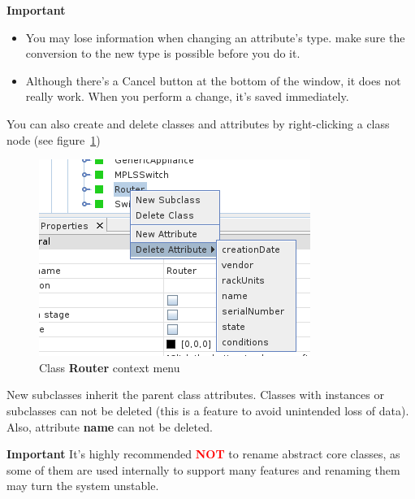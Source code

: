 \documentclass[a4paper]{article}
\begin{document}
			\begin{framed} {\large \textbf{Important}}
				\begin{itemize}
					\item You may lose information when changing an attribute's type. make sure the conversion to the new type is possible before you do it.
					\item Although there's a Cancel button at the bottom of the window, it does not	really work. When you perform a change, it's saved immediately.
				\end{itemize}
			\end{framed}
			You can also create and delete classes and attributes by right-clicking a class node (see figure~\ref{fig:class_node_menu})
			\begin{figure}[h!]
				\centering
				\includegraphics[width=0.4\linewidth]{img/class_node_menu.png}
				\caption{Class \textbf{Router} context menu}
				\label{fig:class_node_menu}
			\end{figure}
			New subclasses inherit the parent class attributes. Classes with instances or subclasses can not be deleted (this is  a  feature to avoid unintended loss of  data). Also, attribute \textbf{name} can not be deleted.
			\begin{framed} {\large \textbf{Important}}
				It's highly recommended \textbf{\textcolor{red}{NOT}} to rename abstract core classes, as some of them are used internally to support many features and renaming them may turn the system unstable.
			\end{framed}
\end{document}
